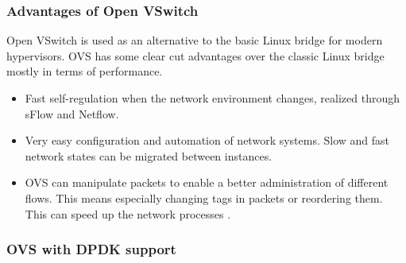 \documentclass[11pt,a4paper,twoside,openright,bachelor,english]{netthesis}
\begin{document}
\subsubsection{Advantages of Open VSwitch}

Open VSwitch is used as an alternative to the basic Linux bridge for modern hypervisors. OVS has some clear cut advantages over the classic Linux bridge mostly in terms of performance. 
\begin{itemize}

\item Fast self-regulation when the network environment changes, realized through sFlow and Netflow. 

\item Very easy configuration and automation of network systems. Slow and fast network states can be migrated between instances. 

\item OVS can manipulate packets to enable a better administration of different flows. This means especially changing tags in packets or reordering them. This can speed up the network processes \cite{pothuraju2016measuring} .

\end{itemize}


\subsubsection{OVS with DPDK support}
\end{document}
